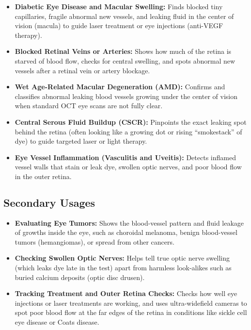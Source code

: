 \begin{itemize}
    \item \textbf{Diabetic Eye Disease and Macular Swelling:} Finds blocked tiny capillaries, fragile abnormal new vessels, and leaking fluid in the center of vision (macula) to guide laser treatment or eye injections (anti-VEGF therapy).
    \item \textbf{Blocked Retinal Veins or Arteries:} Shows how much of the retina is starved of blood flow, checks for central swelling, and spots abnormal new vessels after a retinal vein or artery blockage.
    \item \textbf{Wet Age-Related Macular Degeneration (AMD):} Confirms and classifies abnormal leaking blood vessels growing under the center of vision when standard OCT eye scans are not fully clear.
    \item \textbf{Central Serous Fluid Buildup (CSCR):} Pinpoints the exact leaking spot behind the retina (often looking like a growing dot or rising ``smokestack'' of dye) to guide targeted laser or light therapy.
    \item \textbf{Eye Vessel Inflammation (Vasculitis and Uveitis):} Detects inflamed vessel walls that stain or leak dye, swollen optic nerves, and poor blood flow in the outer retina.
\end{itemize}

\subsection{Secondary Usages}

\begin{itemize}
    \item \textbf{Evaluating Eye Tumors:} Shows the blood-vessel pattern and fluid leakage of growths inside the eye, such as choroidal melanoma, benign blood-vessel tumors (hemangiomas), or spread from other cancers.
    \item \textbf{Checking Swollen Optic Nerves:} Helps tell true optic nerve swelling (which leaks dye late in the test) apart from harmless look-alikes such as buried calcium deposits (optic disc drusen).
    \item \textbf{Tracking Treatment and Outer Retina Checks:} Checks how well eye injections or laser treatments are working, and uses ultra-widefield cameras to spot poor blood flow at the far edges of the retina in conditions like sickle cell eye disease or Coats disease.
\end{itemize}

